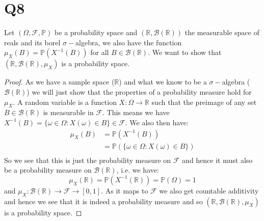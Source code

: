 \documentclass{article}
\begin{document}
\section*{Q8}
Let $(\Omega,\mathcal{F},\mathbb{P})$ be a probability space and $(\mathbb{R},\mathcal{B}(\mathbb{R}))$ the measurable space of reals and its borel $\sigma-$algebra, we also have the function $\mu_{X}(B)=\mathbb{P}(X^{-1}(B))$ for all $B\in\mathcal{B}(\mathbb{R})$. We want to show that $(\mathbb{R},\mathcal{B}(\mathbb{R}),\mu_{X})$ is a probability space.
\begin{proof}
As we have a sample space ($\mathbb{R}$) and what we know to be a $\sigma-$algebra ($\mathcal{B}(\mathbb{R})$) we will just show that the properties of a probability measure hold for $\mu_{X}$. A random variable is a function $X:\Omega\rightarrow\mathbb{R}$ such that the preimage of any set $B\in\mathcal{B}(\mathbb{R})$ is measurable in $\mathcal{F}$. This means we have $X^{-1}(B)=\{\omega\in\Omega:X(\omega)\in B\}\in\mathcal{F}$. We also then have:
\begin{align*}
\mu_{X}(B)&=\mathbb{P}(X^{-1}(B))\\
&=\mathbb{P}(\{\omega\in\Omega:X(\omega)\in B\})\\
\end{align*}
So we see that this is just the probability measure on $\mathcal{F}$ and hence it must also be a probability measure on $\mathcal{B}(\mathbb{R})$, i.e. we have:
$$\mu_{X}(\mathbb{R})=\mathbb{P}(X^{-1}(\mathbb{R}))=\mathbb{P}(\Omega)=1$$
and $\mu_{X}:\mathcal{B}(\mathbb{R})\rightarrow\mathcal{F}\rightarrow[0,1]$. As it maps to $\mathcal{F}$ we also get countable additivity and hence we see that it is indeed a probability measure and so $(\mathbb{R},\mathcal{B}(\mathbb{R}),\mu_{X})$ is a probability space.
\end{proof}
\end{document}
